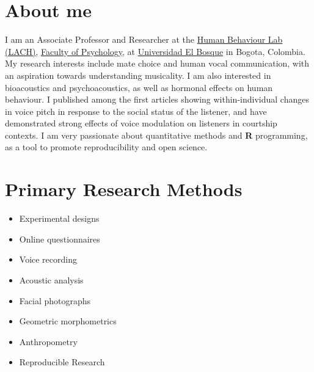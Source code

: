 \documentclass[11pt,a4paper,]{awesome-cv}
\begin{document}
\makecvheader






\hypertarget{about-me}{%
\section{About me}\label{about-me}}

I am an Associate Professor and Researcher at the
\href{https://www.psicologia.unbosque.edu.co/lach}{Human Behaviour Lab
(LACH)}, \href{https://www.uelbosque.edu.co/psicologia}{Faculty of
Psychology}, at \href{https://www.uelbosque.edu.co/}{Universidad El
Bosque} in Bogota, Colombia. My research interests include mate choice
and human vocal communication, with an aspiration towards understanding
musicality. I am also interested in bioacoustics and psychoacoustics, as
well as hormonal effects on human behaviour. I published among the first
articles showing within-individual changes in voice pitch in response to
the social status of the listener, and have demonstrated strong effects
of voice modulation on listeners in courtship contexts. I am very
passionate about quantitative methods and \textbf{R} programming, as a
tool to promote reproducibility and open science.

\hypertarget{primary-research-methods}{%
\section{Primary Research Methods}\label{primary-research-methods}}

\begin{multicols}{2}
\begin{itemize}
 \item Experimental designs
 \item Online questionnaires 
 \item Voice recording
 \item Acoustic analysis
 \item Facial photographs
 \item Geometric morphometrics
 \item Anthropometry
 \item Reproducible Research
\end{itemize}
\end{multicols}
\end{document}
